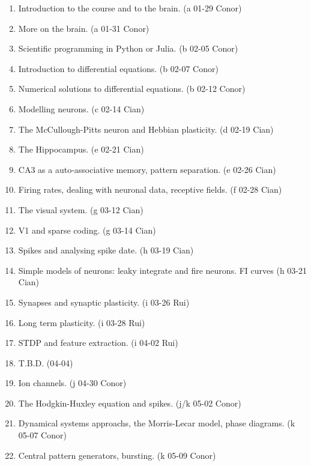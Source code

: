 \documentclass[11pt,a4paper]{scrartcl}
\begin{document}
\begin{enumerate}

\item Introduction to the course and to the brain. (a 01-29 Conor)
\item More on the brain. (a 01-31 Conor)

\item Scientific programming in Python or Julia. (b 02-05 Conor)
\item Introduction to differential equations. (b 02-07 Conor)

\item Numerical solutions to differential equations. (b 02-12 Conor)

\item Modelling neurons. (c 02-14 Cian)
\item The McCullough-Pitts neuron and Hebbian plasticity. (d 02-19 Cian)

\item The Hippocampus. (e 02-21 Cian)
\item CA3 as a auto-associative memory, pattern separation. (e 02-26 Cian)

\item Firing rates, dealing with neuronal data, receptive fields. (f 02-28 Cian)
\newline {}
  
\item The visual system. (g 03-12 Cian)

\item V1 and sparse coding. (g 03-14 Cian)
\item Spikes and analysing spike date. (h 03-19 Cian)

\item Simple models of neurons: leaky integrate and fire neurons. FI curves (h 03-21 Cian)
\item Synapses and synaptic plasticity. (i 03-26 Rui)
\item Long term plasticity. (i 03-28 Rui)
\item STDP and feature extraction. (i 04-02 Rui)
\item T.B.D. (04-04)
\newline {}
  
\item Ion channels. (j 04-30 Conor)
\item The Hodgkin-Huxley equation and spikes. (j/k 05-02 Conor)

\item Dynamical systems approachs, the Morris-Lecar model, phase diagrams. (k 05-07 Conor)
\item Central pattern generators, bursting. (k 05-09 Conor)

\end{enumerate}
\end{document}
